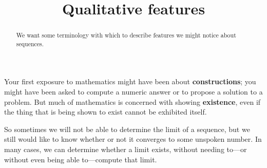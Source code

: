 \documentclass{ximera}
\title{Qualitative features}
\newcommand{\defnword}[1]{\textbf{#1}}
\begin{document}
\begin{abstract}
  We want some terminology with which to describe features we might
  notice about sequences.
\end{abstract}

\maketitle

Your first exposure to mathematics might have been about
\defnword{constructions}; you might have been asked to compute a
numeric answer or to propose a solution to a problem.  But much of
mathematics is concerned with showing \defnword{existence}, even if
the thing that is being shown to exist cannot be exhibited itself.

So sometimes we will not be able to determine the limit of a sequence,
but we still would like to know whether or not it converges to some
unspoken number.  In many cases, we can determine whether a limit
exists, without needing to---or without even being able to---compute
that limit.
\end{document}
